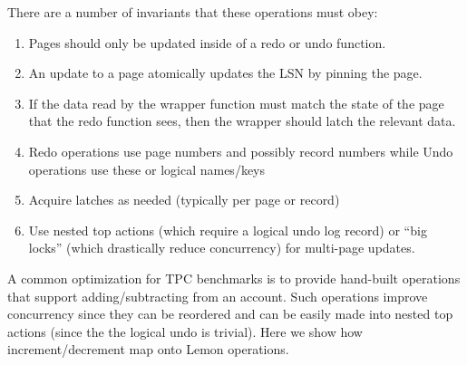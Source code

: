 \documentclass[letterpaper,twocolumn,english]{article}
\newcommand{\yad}{Lemon\xspace}
\begin{document}
There are a number of invariants that these operations must obey:
\begin{enumerate}
\item Pages should only be updated inside of a redo or undo function.
\item An update to a page atomically updates the LSN by pinning the page.
\item If the data read by the wrapper function must match the state of
the page that the redo function sees, then the wrapper should latch
the relevant data.
\item Redo operations use page numbers and possibly record numbers
while Undo operations use these or logical names/keys
\item Acquire latches as needed (typically per page or record)
\item Use nested top actions (which require a logical undo log record) 
or ``big locks'' (which drastically reduce concurrency) for multi-page updates.
\end{enumerate}


A common optimization for TPC benchmarks is to provide hand-built
operations that support adding/subtracting from an account.  Such
operations improve concurrency since they can be reordered and can be
easily made into nested top actions (since the the logical undo is
trivial). Here we show how increment/decrement map onto \yad operations.
\end{document}
